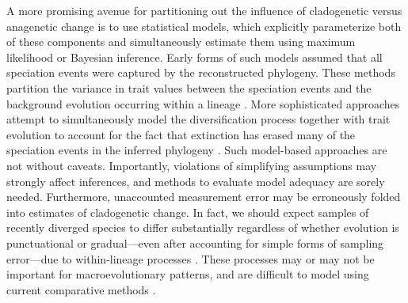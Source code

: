 A more promising avenue for partitioning out the influence of cladogenetic versus anagenetic change is to use statistical models, which explicitly parameterize both of these components and simultaneously estimate them using maximum likelihood or Bayesian inference. Early forms of such models assumed that all speciation events were captured by the reconstructed phylogeny. These methods partition the variance in trait values between the speciation events and the background evolution occurring within a lineage \citep{Pagel1997, Mooers1999, Bokma2002, Wagner2000, WagnerMarcot2010}. More sophisticated approaches attempt to simultaneously model the diversification process together with trait evolution \citep[][see \textsc{box 3} for details]{Bokma2002, Mattila2008, Bokma2008, Bokma2010, Goldberg2012, MagnusonFord2012, Simpson2013} to account for the fact that extinction has erased many of the speciation events in the inferred phylogeny \citep{Nee1992, Nee1994, Nee2006, Ricklefs2007}. Such model-based approaches are not without caveats. Importantly, violations of simplifying assumptions may strongly affect inferences, and methods to evaluate model adequacy are sorely needed. Furthermore, unaccounted measurement error may be erroneously folded into estimates of cladogenetic change. In fact, we should expect samples of recently diverged species to differ substantially regardless of whether evolution is punctuational or gradual---even after accounting for simple forms of sampling error---due to within-lineage processes \citep[e.g., as the result of geographic range variation;][]{Uyeda2011, Houle2011, Hansen2012book}. These processes may or may not be important for macroevolutionary patterns, and are difficult to model using current comparative methods \citep{Futuyma1987,Futuyma2010,Stone2011}.
	
